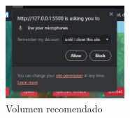 \documentclass[conference]{IEEEtran}
\begin{document}
\begin{figure}[h] %
    \centering
    \includegraphics[width=0.4\textwidth]{images/Micro.png} %
    \caption{Volumen recomendado}
    \label{fig:mi_imagen}
    \vspace{900pt} %
\end{figure}
\end{document}
